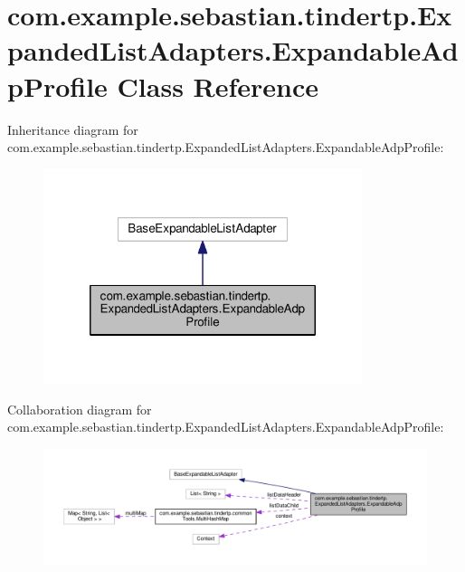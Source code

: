\hypertarget{classcom_1_1example_1_1sebastian_1_1tindertp_1_1ExpandedListAdapters_1_1ExpandableAdpProfile}{}\section{com.\+example.\+sebastian.\+tindertp.\+Expanded\+List\+Adapters.\+Expandable\+Adp\+Profile Class Reference}
\label{classcom_1_1example_1_1sebastian_1_1tindertp_1_1ExpandedListAdapters_1_1ExpandableAdpProfile}


Inheritance diagram for com.\+example.\+sebastian.\+tindertp.\+Expanded\+List\+Adapters.\+Expandable\+Adp\+Profile\+:\nopagebreak
\begin{figure}[H]
\begin{center}
\leavevmode
\includegraphics[width=264pt]{classcom_1_1example_1_1sebastian_1_1tindertp_1_1ExpandedListAdapters_1_1ExpandableAdpProfile__inherit__graph}
\end{center}
\end{figure}


Collaboration diagram for com.\+example.\+sebastian.\+tindertp.\+Expanded\+List\+Adapters.\+Expandable\+Adp\+Profile\+:\nopagebreak
\begin{figure}[H]
\begin{center}
\leavevmode
\includegraphics[width=350pt]{classcom_1_1example_1_1sebastian_1_1tindertp_1_1ExpandedListAdapters_1_1ExpandableAdpProfile__coll__graph}
\end{center}
\end{figure}

